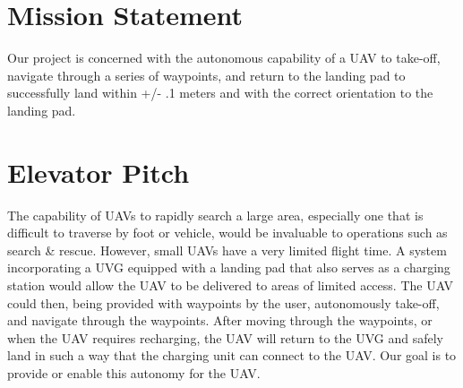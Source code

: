 
\section{Mission Statement}
Our project is concerned with the autonomous capability of a UAV to take-off, navigate through a series of waypoints, and return to the landing pad to successfully land within +/- .1 meters and with the correct orientation to the landing pad.\\

\section{Elevator Pitch}
The capability of UAVs to rapidly search a large area, especially one that is difficult to traverse by foot or vehicle, would be invaluable to operations such as search \& rescue. However, small UAVs have a very limited flight time. A system incorporating a UVG equipped with a landing pad that also serves as a charging station would allow the UAV to be delivered to areas of limited access. The UAV could then, being provided with waypoints by the user, autonomously take-off, and navigate through the waypoints. After moving through the waypoints, or when the UAV requires recharging, the UAV will return to the UVG and safely land in such a way that the charging unit can connect to the UAV. Our goal is to provide or enable this autonomy for the UAV.